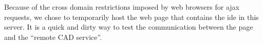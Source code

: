 Because of the cross domain restrictions imposed by web browsers for \gls{ajax} requests, we chose to temporarily host the web page that contains the \gls{ide} in this server.
It is a quick and dirty way to test the communication between the page and the ``remote CAD service''.




